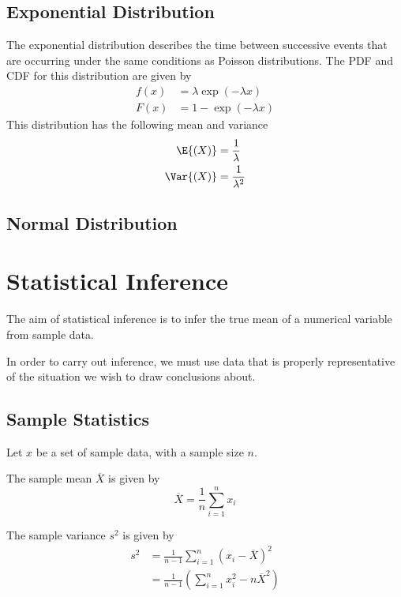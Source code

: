 \documentclass{article}
\begin{document}
\subsection{Exponential Distribution}
The exponential distribution describes the time between successive events that are occurring under the same conditions as Poisson
distributions. The PDF and CDF for this distribution are given by
\begin{align*}
    f(x) & = \lambda \exp{\left( -\lambda x \right)} \\
    F(x) & = 1 - \exp{\left( -\lambda x \right)}
\end{align*}
This distribution has the following mean and variance
\begin{align*}
    \E{\left( X \right)}   & = \frac{1}{\lambda}   \\
    \Var{\left( X \right)} & = \frac{1}{\lambda^2}
\end{align*}
\subsection{Normal Distribution}
\section{Statistical Inference}
The aim of statistical inference is to infer the true mean of a numerical variable from sample data.

In order to carry out inference, we must use data that is properly representative of the situation we wish to draw conclusions about.
\subsection{Sample Statistics}
Let $x$ be a set of sample data, with a sample size $n$.
\begin{theorem}
    The sample mean $\overline{X}$ is given by
    \begin{equation*}
        \overline{X} = \frac{1}{n} \sum_{i = 1}^{n} x_i
    \end{equation*}
\end{theorem}
\begin{theorem}
    The sample variance $s^2$ is given by
    \begin{align*}
        s^2 & = \frac{1}{n - 1} \sum_{i = 1}^{n} \left( x_i - \overline{X} \right)^2     \\
            & = \frac{1}{n - 1} \left( \sum_{i = 1}^{n} x_i^2 - n \overline{X}^2 \right)
    \end{align*}
\end{theorem}
\end{document}
